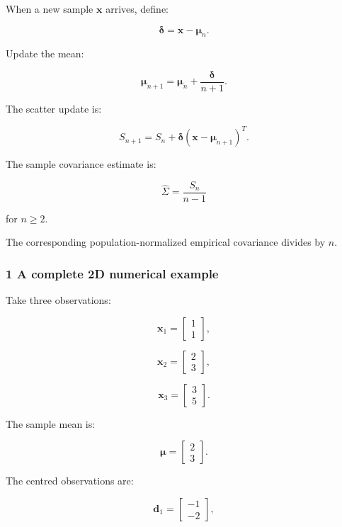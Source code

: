 When a new sample \(\mathbf x\) arrives, define:

\[
 \boldsymbol\delta=\mathbf x-\boldsymbol\mu_n.
\]

Update the mean:

\[
 \boxed{ \boldsymbol\mu_{n+1} = \boldsymbol\mu_n+ \frac{\boldsymbol\delta}{n+1} }.
\]

The scatter update is:

\[
 \boxed{ S_{n+1} = S_n+ \boldsymbol\delta (\mathbf x-\boldsymbol\mu_{n+1})^T }.
\]

The sample covariance estimate is:

\[
 \boxed{ \widehat\Sigma= \frac{S_n}{n-1} }
\]

for \(n\ge2\).

The corresponding population-normalized empirical covariance divides by \(n\).

\subsubsection{1 A complete 2D numerical example}\label{02-foundations-ii-ch031-a-complete-2d-numerical-example}

\hypertarget{02-foundations-ii-ch031-a-complete-2d-numerical-example}{}

Take three observations:

\[
 \mathbf x_1= \begin{bmatrix}1\\1\end{bmatrix},
\]

\[
 \mathbf x_2= \begin{bmatrix}2\\3\end{bmatrix},
\]

\[
 \mathbf x_3= \begin{bmatrix}3\\5\end{bmatrix}.
\]

The sample mean is:

\[
 \boldsymbol\mu= \begin{bmatrix}2\\3\end{bmatrix}.
\]

The centred observations are:

\[
 \mathbf d_1= \begin{bmatrix}-1\\-2\end{bmatrix},
\]

